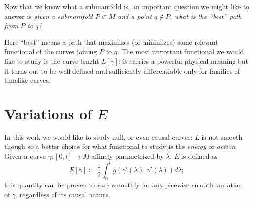 
Now that we know what a submanifold is, an important question we might like to answer is \emph{given a submanifold \(P\subset M\) and a point \(q \notin P\), what is the ``best'' path from \(P\) to \(q\)?} 

Here ``best'' means a path that maximizes (or minimizes) some relevant functional of the curves joining \(P\) to \(q\). The most important functional we would like to study is the curve-lenght \(L[\gamma]\): it carries a powerful physical meaning but it turns out to be well-defined and sufficiently differentiable only for families of timelike curves. 


\section{Variations of \(E\)}

In this work we would like to study null, or even causal curves: \(L\) is not smooth though so a better choice for what functional to study is the \emph{energy} or \emph{action}. Given a curve \(\gamma : [0, l] \rightarrow M\) affinely parametrized by \(\lambda\), \(E\) is defined as
\begin{equation*}
E[\gamma] \coloneqq \frac{1}{2}\int_{0}^{l} g(\gamma'(\lambda), \gamma'(\lambda))d\lambda;
\end{equation*}
this quantity can be proven to vary smoothly for any picewise smooth variation of \(\gamma\), regardless of its causal nature.

%


